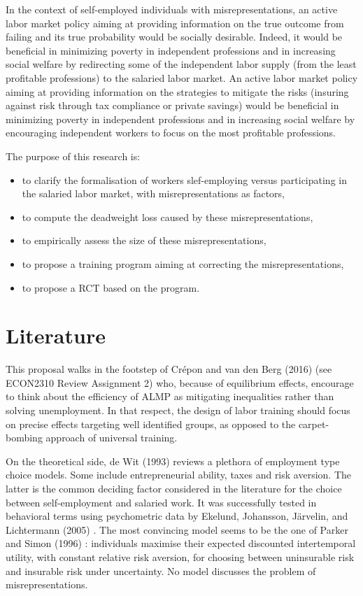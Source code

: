 \documentclass{article}
\begin{document}
In the context of self-employed individuals with misrepresentations, an active labor market policy aiming at providing information on the true outcome from failing and its true probability would be socially desirable. Indeed, it would be beneficial in minimizing poverty in independent professions and in increasing social welfare by redirecting some of the independent labor supply (from the least profitable professions) to the salaried labor market. An active labor market policy aiming at providing information on the strategies to mitigate the risks (insuring against risk through tax compliance or private savings) would be beneficial in minimizing poverty in independent professions and in increasing social welfare by encouraging independent workers to focus on the most profitable professions.

The purpose of this research is:
\begin{itemize}
    \item to clarify the formalisation of workers slef-employing versus participating in the salaried labor market, with misrepresentations as factors,
    \item to compute the deadweight loss caused by these misrepresentations,
    \item to empirically assess the size of these misrepresentations,
    \item to propose a training program aiming at correcting the misrepresentations,
    \item to propose a RCT based on the program.
\end{itemize}

\section{Literature}

This proposal walks in the footstep of Crépon and van den Berg  (2016) \cite{crepon2016} (see ECON2310 Review Assignment 2) who, because of equilibrium effects, encourage to think about the efficiency of ALMP as mitigating inequalities rather than solving unemployment. In that respect, the design of labor training should focus on precise effects targeting well identified groups, as opposed to the carpet-bombing approach of universal training.

On the theoretical side, de Wit (1993) \cite{dewit1993} reviews a plethora of employment type choice models. Some include entrepreneurial ability, taxes and risk aversion. The latter is the common deciding factor considered in the literature for the choice between self-employment and salaried work. It was successfully tested in behavioral terms using psychometric data by Ekelund, Johansson, Järvelin, and Lichtermann (2005) \cite{ekelund2005}. The most convincing model seems to be the one of Parker and Simon (1996) \cite{parker1996}: individuals maximise their expected discounted intertemporal utility, with constant relative risk aversion, for choosing between uninsurable risk and insurable risk under uncertainty. No model discusses the problem of misrepresentations.
\end{document}
